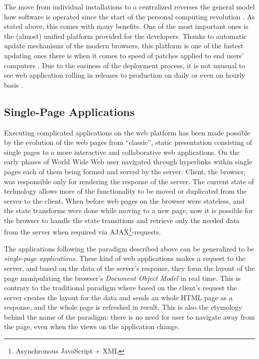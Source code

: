 The move from individual installations to a centralized reverses the general model how software is operated since the start of the personal computing revolution \cite[Chapter 3.3]{jazayeri_trends_????}. As stated above, this comes with many benefits. One of the most important ones is the (almost) unified platform provided for the developers. Thanks to automatic update mechanisms of the modern browsers, this platform is one of the fastest updating ones there is when it comes to speed of patches applied to end users' computers \cite{duebendorfer_why_2009}. Due to the easiness of the deployment process, it is not unusual to see web application rolling in releases to production on daily or even on hourly basis \cite[Chapter 3.3]{jazayeri_trends_????}.



\subsection{Single-Page Applications}
\label{subsec:spa}


Executing complicated applications on the web platform has been made possible by the evolution of the web pages from ``classic'', static presentation consisting of single pages to a more interactive and collaborative web applications. On the early phases of World Wide Web user navigated through hyperlinks within single pages each of them being formed and served by the server. Client, the browser, was responsible only for rendering the response of the server. \cite{taivalsaari_mashware:_2009} The current state of technology allows more of the functionality to be moved or duplicated from the server to the client. When before web pages on the browser were stateless, and the state transforms were done while moving to a new page, now it is possible for the browser to handle the state transitions and retrieve only the needed data from the server when required via AJAX\footnote{Asynchronous JavaScript + XML}-requests. \cite{paulson_building_2005}

The applications following the paradigm described above can be generalized to be \textit{single-page applications}. These kind of web applications makes a request to the server, and based on the data of the server's response, they form the layout of the page manipulating the browser's \textit{Document Object Model} in real time. This is contrary to the traditional paradigm where based on the client's request the server creates the layout for the data and sends an whole HTML page as a response, and the whole page is refreshed in result. This is also the etymology behind the name of the paradigm: there is no need for user to navigate away from the page, even when the views on the application change.

